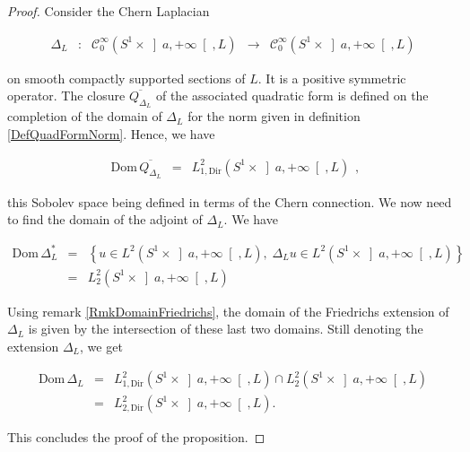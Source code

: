 \documentclass{jams-l}
\theoremstyle{definition}
\theoremstyle{remark}
\numberwithin{equation}{section}
\begin{document}
        \begin{proof}
        
            Consider the Chern Laplacian
            
            \[ \begin{array}{lllll}
                    \Delta_L & : & \mathcal{C}^{\infty}_0 \left( S^1 \times \left] a, + \infty \right[, L \right) & \longrightarrow & \mathcal{C}^{\infty}_0 \left( S^1 \times \left] a, + \infty \right[, L \right)
                \end{array} \]
            
            \noindent on smooth compactly supported sections of $L$. It is a positive symmetric operator. The closure $\overline{Q_{\Delta_L}}$ of the associated quadratic form is defined on the completion of the domain of $\Delta_L$ for the norm given in definition \ref{DefQuadFormNorm}. Hence, we have
            
            \[ \begin{array}{lll}
                    \mathrm{Dom} \, \overline{Q_{\Delta_L}} & = & L^2_{1,\mathrm{Dir}} \left( S^1 \times \left] a, + \infty \right[, L \right)
                \end{array} , \]
            
            \noindent this Sobolev space being defined in terms of the Chern connection. We now need to find the domain of the adjoint of $\Delta_L$. We have
            
            \[ \begin{array}{lllll}
                    \mathrm{Dom} \, \Delta_L^{\ast} & = & \left \{ u \in L^2 \left( S^1 \times \left] a, + \infty \right[, L \right), \; \Delta_L u \in L^2 \left( S^1 \times \left] a, + \infty \right[, L \right) \right \} \\[1em]
                    
                    & = & L^2_2 \left( S^1 \times \left] a, + \infty \right[, L \right)
                \end{array} \]
        
            \noindent Using remark \ref{RmkDomainFriedrichs}, the domain of the Friedrichs extension of $\Delta_L$ is given by the intersection of these last two domains. Still denoting the extension $\Delta_L$, we get
            
            \[ \begin{array}{lll}
                    \mathrm{Dom} \, \Delta_L & = & L^2_{1,\mathrm{Dir}} \left( S^1 \times \left] a, + \infty \right[, L \right) \cap L^2_2 \left( S^1 \times \left] a, + \infty \right[, L \right) \\[1em]
                    
                    & = & L^2_{2, \mathrm{Dir}} \left( S^1 \times \left] a, +\infty \right[, L \right).
                \end{array} \]
            
            \noindent This concludes the proof of the proposition.
        
        \end{proof}
        
\end{document}
